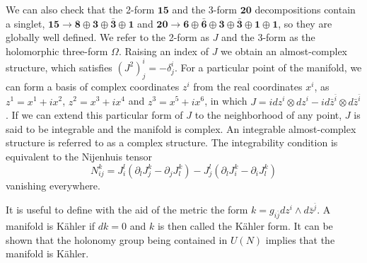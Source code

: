 We can also check that the 2-form $\mathbf {15}$ and the 3-form $\mathbf{20}$ decompositions contain a singlet, 
$\mathbf {15}\to \mathbf 8\oplus \mathbf 3\oplus \bar {\mathbf 3}\oplus \mathbf 1$ and 
$\mathbf {20}\to \mathbf 6\oplus \bar{\mathbf 6}\oplus\mathbf 3\oplus \bar {\mathbf 3}\oplus \mathbf 1\oplus \mathbf 1$,
so they are globally well defined.
We refer to the 2-form as $J$ and the 3-form as the holomorphic three-form $\Omega$.
Raising an index of $J$ we obtain an almost-complex structure, which satisfies $(J^2)^i_j=-\delta^i_j$.
For a particular point of the manifold, we can form a basis of complex coordinates $z^i$ from the real coordinates $x^i$,
as $z^1=x^1+ix^2$, $z^2=x^3+ix^4$ and $z^3=x^5+ix^6$,
in which $J=idz^i\otimes dz^i - i d\bar z^{\bar i}\otimes d\bar z^{\bar i}$.
If we can extend this particular form of $J$ to the neighborhood of any point, $J$ is said to be integrable
and the manifold is complex.
An integrable almost-complex structure is referred to as a complex structure. 
The integrability condition is equivalent to the Nijenhuis tensor 
\begin{equation}
  N^k_{ij}= J^l_i(\partial_l J^k_j - \partial_j J^k_l) - J_j^l (\partial_l J^k_i - \partial_i J^k_l)
\end{equation}
vanishing everywhere.

It is useful to define with the aid of the metric the form $k=g_{i\bar j} dz^i \wedge d\bar z^{\bar j}$.
A manifold is Kähler if $dk=0$ and $k$ is then called the Kähler form.
It can be shown that the holonomy group being contained in $U(N)$ implies that the manifold is Kähler.

